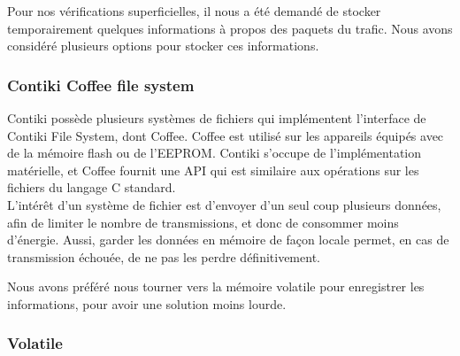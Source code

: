 		Pour nos vérifications superficielles, il nous a été demandé de stocker temporairement quelques informations à propos des paquets du trafic. Nous avons considéré plusieurs options pour stocker ces informations.

		\subsubsection{Contiki Coffee file system}
			Contiki possède plusieurs systèmes de fichiers qui implémentent l'interface de Contiki File System, dont Coffee. Coffee est utilisé sur les appareils équipés avec de la mémoire flash ou de l'EEPROM. Contiki s'occupe de l'implémentation matérielle, et Coffee fournit une API qui est similaire aux opérations sur les fichiers du langage C standard.\\
			
			L'intérêt d'un système de fichier est d'envoyer d'un seul coup plusieurs données, afin de limiter le nombre de transmissions, et donc de consommer moins d'énergie. Aussi, garder les données en mémoire de façon locale permet, en cas de transmission échouée, de ne pas les perdre définitivement.
			
			Nous avons préféré nous tourner vers la mémoire volatile pour enregistrer les informations, pour avoir une solution moins lourde.
		\subsubsection{Volatile}
			
